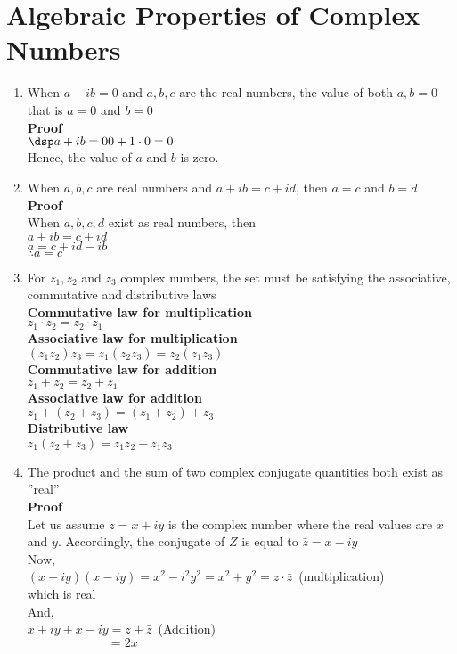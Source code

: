 \documentclass[11pt]{report}
\newcommand{\sps}{\\[0.2cm]}
\newcommand{\bt}[1]{\textbf{#1}}
\begin{document}
	\section{Algebraic Properties of Complex Numbers}
	\begin{enumerate}
		\item When $a+ib=0$ and $a,b,c$ are the real numbers, the value of both $a,b=0$ that is $a=0$ and $b=0$\sps
		\bt{Proof}\sps
		$\dsp
		a+ib=0\\
		0+1\cdot 0 = 0
		$\sps
		Hence, the value of $a$ and $b$ is zero. \\
		\item When $a,b,c$ are real numbers and $a+ib=c+id$, then $a=c$ and $b=d$\sps
		\bt{Proof}\sps
		When $a,b,c,d$ exist as real numbers, then\\
		$a+ib=c+id$\\
		$a=c+id-ib$\\
		$\therefore a=c$\\
		\item For $z_1, z_2$ and $z_3$ complex numbers, the set must be satisfying the associative, commutative and distributive laws\sps
		\bt{Commutative law for multiplication}\\
		$z_1\cdot z_2 = z_2 \cdot z_1$\sps
		\bt{Associative law for multiplication}\\
		$(z_1z_2)z_3 = z_1(z_2z_3) = z_2(z_1z_3)$\sps
		\bt{Commutative law for addition}\\
		$z_1 + z_2 = z_2 + z_1$\sps
		\bt{Associative law for addition}\\
		$z_1+(z_2+z_3) = (z_1+z_2) + z_3$\sps
		\bt{Distributive law}\\
		$z_1(z_2+z_3) = z_1z_2 + z_1z_3$\sps
		\item The product and the sum of two complex conjugate quantities both exist as ''real''\\
		\bt{Proof}\sps
		Let us assume $z=x+iy$ is the complex number where the real values are $x$ and $y$. Accordingly, the conjugate of $Z$ is equal to $\bar{z} = x-iy$\\
		Now,\\
		$(x+iy)(x-iy) = x^2-i^2y^2 = x^2 + y^2 = z\cdot \bar{z}$~(multiplication)\\
		which is real\\
		And,\\
		$x+iy + x-iy = z + \bar{z}$~(Addition)\\
		${}\qquad\qquad\qquad~~=2x$\\

\end{enumerate}
\end{document}
